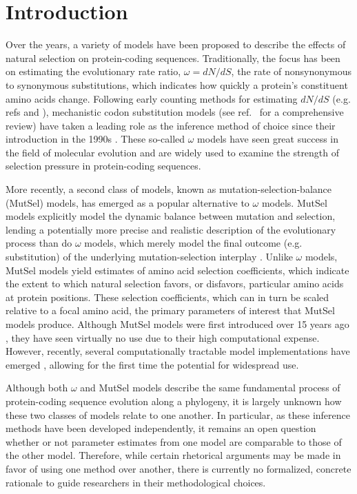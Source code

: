 \documentclass[11pt]{article}
\begin{document}
\section*{Introduction}

Over the years, a variety of models have been proposed to describe the effects of natural selection on protein-coding sequences. Traditionally, the focus has been on estimating the evolutionary rate ratio, $\omega = dN/dS$, the rate of nonsynonymous to synonymous substitutions, which indicates how quickly a protein's constituent amino acids change. Following early counting methods for estimating $dN/dS$ (e.g. refs \cite{LWL85} and \cite{NG86}), mechanistic codon substitution models (see ref.~\cite{Anisimova2009} for a comprehensive review) have taken a leading role as the inference method of choice since their introduction in the 1990s \cite{GoldmanYang1994, MuseGaut1994}. These so-called $\omega$ models have seen great success in the field of molecular evolution and are widely used to examine the strength of selection pressure in protein-coding sequences. 

More recently, a second class of models, known as mutation-selection-balance (MutSel) models, has emerged as a popular alternative to $\omega$ models. MutSel models explicitly model the dynamic balance between mutation and selection, lending a potentially more precise and realistic description of the evolutionary process than do $\omega$ models, which merely model the final outcome (e.g. substitution) of the underlying mutation-selection interplay \cite{HalpernBruno1998, YangNielsen2008, Rodrigueetal2010, Tamurietal2012}. Unlike $\omega$ models, MutSel models yield estimates of amino acid selection coefficients, which indicate the extent to which natural selection favors, or disfavors, particular amino acids at protein positions. These selection coefficients, which can in turn be scaled relative to a focal amino acid, the primary parameters of interest that MutSel models produce. Although MutSel models were first introduced over 15 years ago \cite{HalpernBruno1998}, they have seen virtually no use due to their high computational expense. However, recently, several computationally tractable model implementations have emerged \cite{RodrigueLartillot2014,Tamurietal2014}, allowing for the first time the potential for widespread use. 

Although both $\omega$ and MutSel models describe the same fundamental process of protein-coding sequence evolution along a phylogeny, it is largely unknown how these two classes of models relate to one another. In particular, as these inference methods have been developed independently, it remains an open question whether or not parameter estimates from one model are comparable to those of the other model. Therefore, while certain rhetorical arguments may be made in favor of using one method over another, there is currently no formalized, concrete rationale to guide researchers in their methodological choices. 
\end{document}
